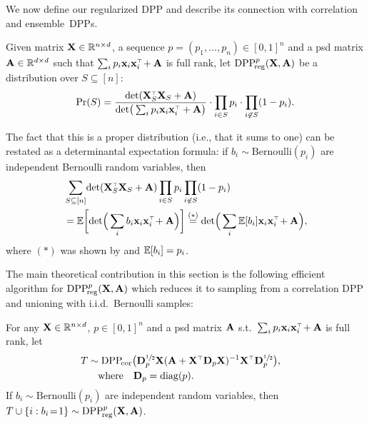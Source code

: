 \documentclass[11pt]{article}
\begin{document}
We now define our regularized DPP and describe its
connection with correlation and ensemble~DPPs.
\begin{definition}\label{d:r-dpp}
Given matrix $\mathbf X\in\mathbb R^{n\times d}$, a sequence  $p=(p_1,\dots,p_n)\in[0,1]^n$
and a psd matrix $\mathbf A\in\mathbb R^{d\times d}$ such that
$\sum_ip_i\x_i\x_i^\top\!+\A$ is
full rank, let
${{\mathrm{DPP}}_{\!\mathrm{reg}}^{p}}(\mathbf X,\mathbf A)$ be a distribution over $S\subseteq [n]$:
  \begin{align}
  \Pr(S) = \frac{\det(
  \X_S^\top\X_S+\A)}{\det\!\big(
 \sum_ip_i\x_i\x_i^\top+ \A\big)}
\cdot \prod_{i\in S}p_{i}\cdot\prod_{i\not\in S}(1-p_i).\label{eq:poisson-prob}
\end{align}
\end{definition}
The fact that this is a proper distribution (i.e., that it sums to
one) can be restated as a determinantal expectation formula: if
$b_i\sim\mathrm{Bernoulli}(p_i)$ are independent Bernoulli random
variables, then
\begin{align*}
  &\sum_{S\subseteq [n]}\!\det(
  \X_S^\top\X_S+\A)\prod_{i\in S}p_{i}\prod_{i\not\in S}(1-p_i) \\
  &=
  \E\bigg[\!\det\!\Big(\sum_ib_i\x_i\x_i^\top\!+\A\Big)\bigg]\overset{(*)}{=}
  \det\!\Big(\sum_i\E[b_i]\x_i\x_i^\top\!+\A\Big),
\end{align*}
where $(*)$ was shown by \cite[Lemma
7]{determinantal-averaging} and $\mathbb E[b_i]=p_i$.

  The main theoretical contribution in this section is the
  following efficient algorithm for ${{\mathrm{DPP}}_{\!\mathrm{reg}}^{p}}(\mathbf X,\mathbf A)$ which reduces it to
  sampling from a correlation DPP and unioning with i.i.d.~Bernoulli samples:
\begin{theorem}\label{t:algorithm}
For any $\mathbf X\in\mathbb R^{n\times d}$, $p\in[0,1]^n$ and a psd matrix $\mathbf A$
s.t.~$\sum_ip_i\x_i\x_i^\top\!+\A$ is
full rank, let
\begin{align*}
  T&\sim\DPPcor\big(\D_p^{\sfrac12}\X(\A+\X^\top\D_p\X)^{-1}\X^\top\D_p^{\sfrac12}\big),
  \quad\\
  &\quad\text{where}\quad\D_p=\diag(p).
\end{align*}
If $b_i\sim\mathrm{Bernoulli}(p_i)$ are independent random variables, then
$T\cup \{i:b_i\!=\!1\}\sim {{\mathrm{DPP}}_{\!\mathrm{reg}}^{p}}(\mathbf X,\mathbf A)$.
\end{theorem}
\end{document}
